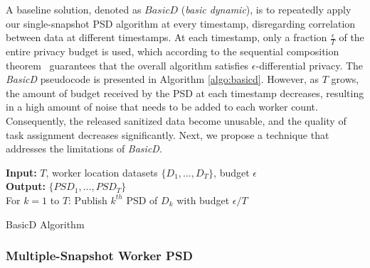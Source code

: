 \documentclass{USC-Thesis}
\numberwithin{equation}{chapter}
\begin{document}
A baseline solution, denoted as $\mathit{BasicD}$ ({\em basic dynamic}), is to repeatedly apply our single-snapshot PSD algorithm at every timestamp, disregarding correlation between data at different timestamps.  At each timestamp, only a fraction $\frac{\epsilon}{T}$ of the entire privacy budget is used, which according to the sequential composition theorem~\cite{cormode2012differentially} guarantees that the overall algorithm satisfies $\epsilon$-differential privacy. The {\em BasicD} pseudocode is presented in Algorithm \ref{algo:basicd}.  However, as $T$ grows, the amount of budget received by the PSD at each timestamp decreases, resulting in a high amount of noise that needs to be added to each worker count. Consequently, the released sanitized data become unusable, and the quality of task assignment decreases significantly. Next, we propose a technique that addresses the limitations of {\em BasicD}. 

\begin{comment}
\begin{algorithm}[ht]
\small
\begin{algorithmic}[1]
\STATE \textbf{Input:} $T$, worker location datasets $\{D_1, ..., D_T\}$, budget $\epsilon$ \\
\STATE \textbf{Output:} $\mathit{PSD_1}$ \\
\STATE  Publish $PSD_1$ of $D_1$ with budget $\epsilon$\\
\end{algorithmic}
\caption{BasicS Algorithm} \label{algo:basics}
\end{algorithm}
\end{comment}

\begin{algorithm}[ht]
\small
\begin{algorithmic}[1]
\STATE \textbf{Input:} $T$, worker location datasets $\{D_1, ..., D_T\}$, budget $\epsilon$\\
\STATE \textbf{Output:} $\{\mathit{PSD_1}, \ldots, \mathit{PSD_T} \}$ \\
\STATE For $k=1$ to $T$:
\STATE \hspace*{4mm} Publish $k^{th}$ PSD of $D_k$ with budget $\epsilon/T$\\
\end{algorithmic}
\caption{BasicD Algorithm} \label{algo:basicd}
\end{algorithm}

\subsubsection{Multiple-Snapshot Worker PSD}
\end{document}
